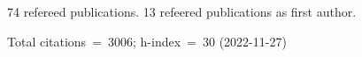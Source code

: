 74 refereed publications. 13 refeered publications as first author.

Total citations~=~3006; h-index~=~30 (2022-11-27)